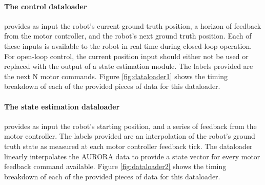 \paragraph{The control dataloader} provides as input the robot's current ground truth position, a horizon of feedback from the motor controller, and the robot's next ground truth position. Each of these inputs is available to the robot in real time during closed-loop operation. For open-loop control, the current position input should either not be used or replaced with the output of a state estimation module. The labels provided are the next N motor commands. Figure \ref{fig:dataloader1} shows the timing breakdown of each of the provided pieces of data for this dataloader. 

\paragraph{The state estimation dataloader} provides as input the robot's starting position, and a series of feedback from the motor controller. The labels provided are an interpolation of the robot's ground truth state as measured at each motor controller feedback tick. The dataloader linearly interpolates the AURORA data to provide a state vector for every motor feedback command available. Figure \ref{fig:dataloader2} shows the timing breakdown of each of the provided pieces of data for this dataloader. 
